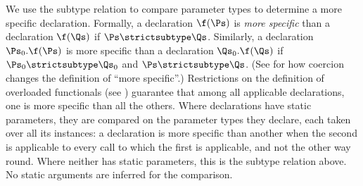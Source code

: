 We use the subtype relation to compare parameter types to determine
a more specific declaration.
Formally, a declaration $\f(\Ps)$ is \emph{more specific} than a declaration
$\f(\Qs)$ if $\Ps \strictsubtype \Qs$.  Similarly, a declaration
$\Ps_0.\f(\Ps)$ is more specific than a declaration $\Qs_0.\f(\Qs)$
if $\Ps_0 \strictsubtype \Qs_0$ and $\Ps \strictsubtype \Qs$.
(See  for how coercion
changes the definition of ``more specific''.)
Restrictions on the definition of overloaded functionals
(see )
guarantee that among all applicable declarations,
one is more specific than all the others.
Where declarations have static parameters, they are compared on the parameter
types they declare, each taken over all its instances: a declaration is more
specific than another when the second is applicable to every call to which the
first is applicable, and not the other way round.
Where neither has static parameters, this is the subtype relation above.
No static arguments are inferred for the comparison.

